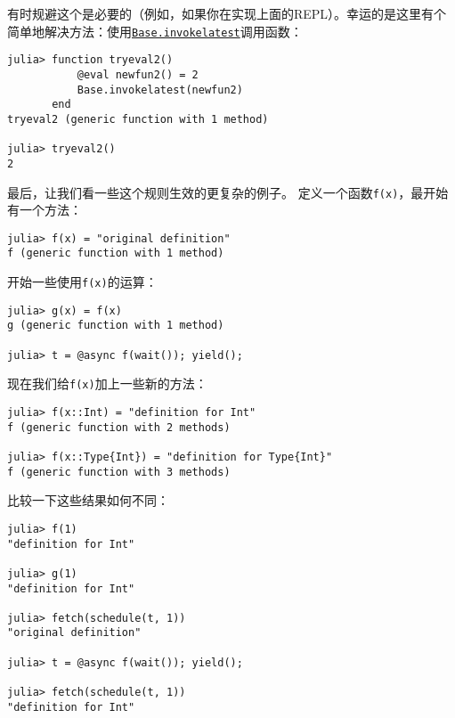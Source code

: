 有时规避这个是必要的（例如，如果你在实现上面的REPL）。幸运的是这里有个简单地解决方法：使用\hyperlink{15240876280767285272}{\texttt{Base.invokelatest}}调用函数：




\begin{verbatim}
julia> function tryeval2()
           @eval newfun2() = 2
           Base.invokelatest(newfun2)
       end
tryeval2 (generic function with 1 method)

julia> tryeval2()
2
\end{verbatim}



最后，让我们看一些这个规则生效的更复杂的例子。 定义一个函数\texttt{f(x)}，最开始有一个方法：




\begin{verbatim}
julia> f(x) = "original definition"
f (generic function with 1 method)
\end{verbatim}



开始一些使用\texttt{f(x)}的运算：




\begin{verbatim}
julia> g(x) = f(x)
g (generic function with 1 method)

julia> t = @async f(wait()); yield();
\end{verbatim}



现在我们给\texttt{f(x)}加上一些新的方法：




\begin{verbatim}
julia> f(x::Int) = "definition for Int"
f (generic function with 2 methods)

julia> f(x::Type{Int}) = "definition for Type{Int}"
f (generic function with 3 methods)
\end{verbatim}



比较一下这些结果如何不同：




\begin{verbatim}
julia> f(1)
"definition for Int"

julia> g(1)
"definition for Int"

julia> fetch(schedule(t, 1))
"original definition"

julia> t = @async f(wait()); yield();

julia> fetch(schedule(t, 1))
"definition for Int"
\end{verbatim}



